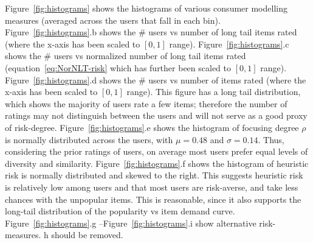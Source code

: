 Figure~\ref{fig:histograms} shows  the histograms of various consumer modelling measures (averaged across the users that fall in each bin).
Figure~\ref{fig:histograms}.b  shows the \# users vs number of long tail items rated (where the x-axis has been scaled to $[0,1]$ range). 
Figure~\ref{fig:histograms}.c shows the \# users vs normalized number of long tail items rated (equation~\ref{eq:NorNLT-risk} which has further been scaled to $[0,1]$ range).  
Figure~\ref{fig:histograms}.d shows the \# users vs number of items rated (where the x-axis has been scaled to $[0,1]$ range). 
This figure has a long tail distribution, which shows the majority of users rate a few items; therefore the number of ratings may  not distinguish between the users and will not serve as a good proxy of risk-degree.
Figure~\ref{fig:histograms}.e shows the histogram of focusing degree $\rho$ is normally distributed  across the users, with $\mu = 0.48$ and $\sigma = 0.14$. Thus, considering the prior ratings of  users, on average most users prefer equal levels of diversity and similarity. 
Figure~\ref{fig:histograms}.f shows the histogram of heuristic risk is normally distributed and skewed to the right. This suggests heuristic risk is relatively low among users and that  most users are risk-averse, and take less chances with the unpopular items. This is reasonable, since it also supports the long-tail distribution of the popularity vs item demand curve. 
Figure~\ref{fig:histograms}.g --Figure~\ref{fig:histograms}.i show alternative risk-measures. h should be removed. 
